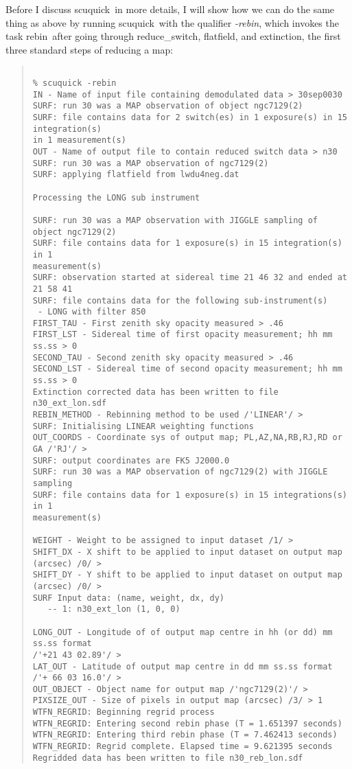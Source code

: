 \documentclass[twoside,11pt]{article}
\newenvironment{myquote}{\begin{quote}\begin{small}}{\end{small}\end{quote}}
\newcommand{\task}[1]{\textsf{#1}}
\newcommand{\rebin}{\xref{\task{rebin}}{sun216}{REBIN}}
\newcommand{\resw}{\xref{\task{reduce\_switch}}{sun216}{REDUCE_SWITCH}}
\newcommand{\flatf}{\xref{\task{flatfield}}{sun216}{FLATFIELD}}
\newcommand{\ext}{\xref{\task{extinction}}{sun216}{EXTINCTION}}
\newcommand{\scuquick}{\xref{\task{scuquick}}{sun216}{SCUQUICK}}
\newcommand{\xref}[3]{#1}
\begin{document}
Before I discuss \scuquick\ in more details, I will show how we can
do the same thing as above by running \scuquick\ with the qualifier
{\it -rebin}, which invokes the task \rebin\ after going through
\resw, \flatf, and \ext, the first three
standard steps of reducing a map:

\begin{myquote} \begin{verbatim}

% scuquick -rebin 
IN - Name of input file containing demodulated data > 30sep0030
SURF: run 30 was a MAP observation of object ngc7129(2)
SURF: file contains data for 2 switch(es) in 1 exposure(s) in 15 integration(s)
in 1 measurement(s)
OUT - Name of output file to contain reduced switch data > n30
SURF: run 30 was a MAP observation of ngc7129(2)
SURF: applying flatfield from lwdu4neg.dat
 
Processing the LONG sub instrument
 
SURF: run 30 was a MAP observation with JIGGLE sampling of object ngc7129(2)
SURF: file contains data for 1 exposure(s) in 15 integration(s) in 1
measurement(s)
SURF: observation started at sidereal time 21 46 32 and ended at 21 58 41
SURF: file contains data for the following sub-instrument(s)
 - LONG with filter 850
FIRST_TAU - First zenith sky opacity measured > .46
FIRST_LST - Sidereal time of first opacity measurement; hh mm ss.ss > 0
SECOND_TAU - Second zenith sky opacity measured > .46
SECOND_LST - Sidereal time of second opacity measurement; hh mm ss.ss > 0
Extinction corrected data has been written to file n30_ext_lon.sdf
REBIN_METHOD - Rebinning method to be used /'LINEAR'/ > 
SURF: Initialising LINEAR weighting functions
OUT_COORDS - Coordinate sys of output map; PL,AZ,NA,RB,RJ,RD or GA /'RJ'/ > 
SURF: output coordinates are FK5 J2000.0
SURF: run 30 was a MAP observation of ngc7129(2) with JIGGLE sampling
SURF: file contains data for 1 exposure(s) in 15 integrations(s) in 1
measurement(s)
 
WEIGHT - Weight to be assigned to input dataset /1/ > 
SHIFT_DX - X shift to be applied to input dataset on output map (arcsec) /0/ > 
SHIFT_DY - Y shift to be applied to input dataset on output map (arcsec) /0/ > 
SURF Input data: (name, weight, dx, dy)
   -- 1: n30_ext_lon (1, 0, 0)
 
LONG_OUT - Longitude of of output map centre in hh (or dd) mm ss.ss format 
/'+21 43 02.89'/ > 
LAT_OUT - Latitude of output map centre in dd mm ss.ss format 
/'+ 66 03 16.0'/ > 
OUT_OBJECT - Object name for output map /'ngc7129(2)'/ > 
PIXSIZE_OUT - Size of pixels in output map (arcsec) /3/ > 1
WTFN_REGRID: Beginning regrid process
WTFN_REGRID: Entering second rebin phase (T = 1.651397 seconds)
WTFN_REGRID: Entering third rebin phase (T = 7.462413 seconds)
WTFN_REGRID: Regrid complete. Elapsed time = 9.621395 seconds
Regridded data has been written to file n30_reb_lon.sdf

\end{verbatim} \end{myquote}
\end{document}
